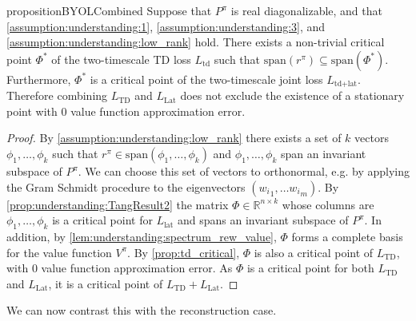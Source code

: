 \begin{restatable}{proposition}{BYOLCombined}\label{prop:understanding:BYOLCombined}
    Suppose that $P^\pi$ is real diagonalizable, and that \autoref{assumption:understanding:1}, \autoref{assumption:understanding:3}, and \autoref{assumption:understanding:low_rank} hold. 
    There exists a non-trivial critical point $\Phi^*$ of the two-timescale TD loss $L_\text{td}$ such that $\mathrm{span}(r^\pi)\subseteq \mathrm{span}(\Phi^*)$. 
    Furthermore, $\Phi^*$ is a critical point of the two-timescale joint loss $L_{\text{td}+\text{lat}}$. Therefore combining $L_\text{TD}$ and $L_\text{Lat}$ does not exclude the existence of a stationary point with $0$ value function approximation error.
\end{restatable}
\begin{proof}
        By \autoref{assumption:understanding:low_rank} there exists a set of $k$ vectors $\phi_1,\allowbreak \dots, \allowbreak \phi_k$ such that $r^\pi \in \text{span}(\phi_1,\allowbreak\dots,\allowbreak\phi_k)$ and $\phi_1,\dots,\phi_k$ span an invariant subspace of $P^\pi$.
        We can choose this set of vectors to orthonormal, e.g. by applying the Gram Schmidt procedure to the eigenvectors $({w_i}_1,\dots{w_i}_m)$. 
        By \autoref{prop:understanding:TangResult2} the matrix $\Phi\in \mathbb{R}^{n\times k}$ whose columns are $\phi_1,\dots,\phi_k$ is a critical point for $L_\text{lat}$ and spans an invariant subspace of $P^\pi$.
        In addition, by \autoref{lem:understanding:spectrum_rew_value}, $\Phi$ forms a complete basis for the value function $V^\pi$.
        By \autoref{prop:td_critical}, $\Phi$ is also a critical point of $L_\text{TD}$, with $0$ value function approximation error. 
        As $\Phi$ is a critical point for both $L_\text{TD}$ and $L_\text{Lat}$, it is a critical point of $L_\text{TD} + L_\text{Lat}$.
\end{proof}


We can now contrast this with the reconstruction case.

